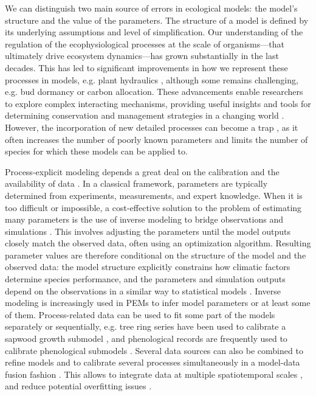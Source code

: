 \documentclass[letterpaper,8pt]{extarticle}  %
\begin{document}
\begin{doublespacing}
\begin{linenumbers}
We can distinguish two main source of errors in ecological models: the model's structure and the value of the parameters. The structure of a model is defined by its underlying assumptions and level of simplification. Our understanding of the regulation of the ecophysiological processes at the scale of organisms---that ultimately drive  ecosystem dynamics---has grown substantially in the last decades. This has led to significant improvements in how we represent these processes in models, e.g. plant hydraulics \citep{Ruffault2022} , although some remains challenging, e.g. bud dormancy \citep{Chuine2016} or carbon allocation. 
These advancements enable researchers to explore complex interacting mechanisms, providing useful insights and tools for determining conservation and management strategies in a changing world \citep{Urban2016}. However, the incorporation of new detailed processes can become a trap \citep{Franklin2020}, as it often increases the number of poorly known parameters and limits the number of species for which these models can be applied to. %

Process-explicit modeling depends a great deal on the calibration and the availability of data \citep{Cabral2017}. In a classical framework, parameters are typically determined from experiments, measurements, and expert knowledge. When it is too difficult or impossible, a cost-effective solution to the problem of estimating many parameters is the use of inverse modeling to bridge observations and simulations \citep{Evans2016}. This involves adjusting the parameters until the model outputs closely match the observed data, often using an optimization algorithm. Resulting parameter values are therefore conditional on the structure of the model  and the observed data: the model structure explicitly constrains how climatic factors determine species performance, and the parameters and simulation outputs depend on the observations in a similar way to statistical models \citep{Zhang2024}. Inverse modeling is increasingly used in PEMs to infer model parameters or at least some of them. Process-related data can be used to fit some part of the models separately or sequentially, e.g. tree ring series have been used to calibrate a sapwood growth submodel \citep{DeCaceres2023}, and phenological records are frequently used to calibrate phenological submodels \citep{Chuine2013}. Several data sources can also be combined to refine models \citep{BenitoGarzon2019} and to calibrate several processes simultaneously in a model-data fusion fashion \citep[e.g.][]{Trotsiuk2020}. This allows to integrate data at multiple spatiotemporal scales \citep{Hartig2012, Niu2014}, and reduce potential overfitting issues \citep{Bacour2023}.


\end{linenumbers}
\end{doublespacing}
\end{document}
